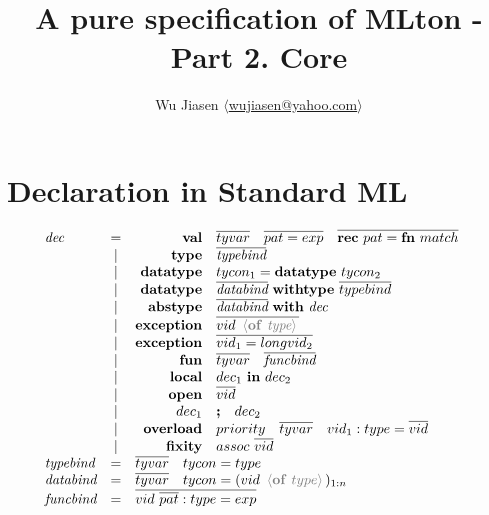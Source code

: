 \documentclass[11pt,a4paper]{article}
\newcommand{\key}[1]{\textrm{\textbf{#1}}}
\newcommand{\prodlhs}[1]{\textit{#1}}
\newcommand{\angled}[1]{\,{\color{gray}\langle#1\rangle}\,}
\begin{document}
\title {A pure specification of MLton - Part 2. Core}
\author{Wu Jiasen $\langle$\href{mailto:wujiasen@yahoo.com}{wujiasen@yahoo.com}$\rangle$}
\maketitle 
\thispagestyle{fancy}

\section{Declaration in Standard ML}
{\renewcommand{\arraystretch}{1.2}\[
\begin{array}{lcrll}
\prodlhs{dec}
     & = & \key{val}  	  & \overline{tyvar} \quad \overline{pat = exp} \quad \overline{\key{rec}\ pat = \key{fn}\ match} &\\
     & | & \key{type} 	  & \overline{\prodlhs{typebind}}                                &\\
     & | & \key{datatype} & tycon_1 = \key{datatype}\ tycon_2                            &\\
     & | & \key{datatype} & \overline{\prodlhs{databind}} \ \key{withtype}\ \overline{typebind} &\\
     & | & \key{abstype}  & \overline{\prodlhs{databind}} \ \key{with}\ \prodlhs{dec}      &\\
     & | & \key{exception}& \overline{vid\ \angled{\key{of}\ \prodlhs{type}}}   &\\
     & | & \key{exception}& \overline{vid_1 = longvid_2}               &\\
     & | & \key{fun}      & \overline{tyvar} \quad \overline{\prodlhs{funcbind}} &\\
     & | & \key{local}    & \prodlhs{$dec_1$} \ \key{in}\ \prodlhs{$dec_2$}     &\\
     & | & \key{open}     & \overline{vid}                          	&\\
     & | & \prodlhs{$dec_1$} & \key{;}\quad \prodlhs{$dec_2$} &\\
     & | & \key{overload} & priority \quad \overline{tyvar} \quad vid_1:type=\overline{vid}&\\
     & | & \key{fixity}   & assoc\ \overline{vid}                      &\\
\prodlhs{typebind} 
     & = & \multicolumn{2}{l}{\overline{tyvar} \quad tycon = type } 		&\\
\prodlhs{databind}
	 & = & \multicolumn{2}{l}{\overline{tyvar} \quad tycon = (vid \ \angled{\key{of}\ type})_{1:n} } 		&\\
\prodlhs{funcbind}
	 & = & \multicolumn{2}{l}{\overline{vid \ \overline{pat}:type = exp}} &\\
\end{array}
\]}
\end{document}

